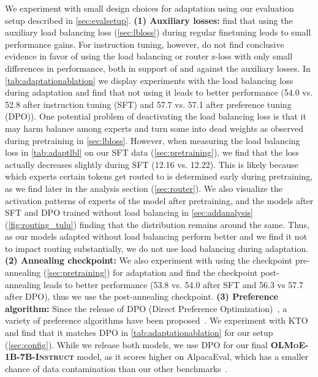 \documentclass{article}
\newcommand{\modelsmalldpo}{\textbf{\textsc{OLMoE-1B-7B-Instruct}}}
\begin{document}
We experiment with small design choices for adaptation using our evaluation setup described in \autoref{sec:evalsetup}. \textbf{(1) Auxiliary losses:} \citet{zoph2022stmoe} find that using the auxiliary load balancing loss (\autoref{sec:lbloss}) during regular finetuning leads to small performance gains. For instruction tuning, however, \citet{shen2023mixtureofexperts} do not find conclusive evidence in favor of using the load balancing or router z-loss with only small differences in performance, both in support of and against the auxiliary losses. In \autoref{tab:adaptationablation} we display experiments with the load balancing loss during adaptation and find that not using it leads to better performance (54.0 vs. 52.8 after instruction tuning (SFT) and 57.7 vs. 57.1 after preference tuning (DPO)). One potential problem of deactivating the load balancing loss is that it may harm balance among experts and turn some into dead weights as observed during pretraining in \autoref{sec:lbloss}. However, when measuring the load balancing loss in \autoref{tab:adaptlbl} on our SFT data (\autoref{sec:pretraining}), we find that the loss actually decreases slightly during SFT (12.16 vs. 12.22).
This is likely because which experts certain tokens get routed to is determined early during pretraining, as we find later in the analysis section (\autoref{sec:router}). We also visualize the activation patterns of experts of the model after pretraining, and the models after SFT and DPO trained without load balancing in \autoref{sec:addanalysis} (\autoref{fig:routing_tulu}) finding that the distribution remains around the same. Thus, as our models adapted without load balancing perform better and we find it not to impact routing substantially, \colorbox{lightOlmoeYellow}{we do not use load balancing during adaptation}. \textbf{(2) Annealing checkpoint:} We also experiment with using the checkpoint pre-annealing (\autoref{sec:pretraining}) for adaptation and find the checkpoint post-annealing leads to better performance (53.8 vs. 54.0 after SFT and 56.3 vs 57.7 after DPO), thus \colorbox{lightOlmoeYellow}{we use the post-annealing checkpoint.} \textbf{(3) Preference algorithm:} Since the release of DPO (Direct Preference Optimization)~\citep{rafailov2023direct}, a variety of preference algorithms have been proposed~\citep{ethayarajh2024kto,hong2024orpomonolithicpreferenceoptimization,meng2024simposimplepreferenceoptimization}. We experiment with KTO~\citep{ethayarajh2024kto} and find that it matches DPO in \autoref{tab:adaptationablation} for our setup (\autoref{sec:config}). While we release both models, \colorbox{lightOlmoeYellow}{we use DPO} for our final \modelsmalldpo{} model, as it scores higher on AlpacaEval, which has a smaller chance of data contamination than our other benchmarks~\citep{xu2024benchmarkdatacontaminationlarge}.
\end{document}
